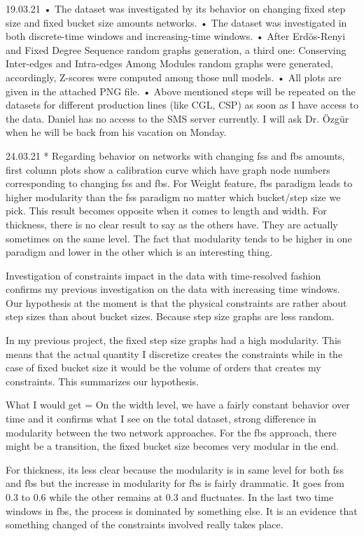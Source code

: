 19.03.21
•	The dataset was investigated by its behavior on changing fixed step size and fixed bucket size amounts networks.
•	The dataset was investigated in both discrete-time windows and increasing-time windows.
•	After Erdös-Renyi and Fixed Degree Sequence random graphs generation, a third one: Conserving Inter-edges and Intra-edges Among Modules random graphs were generated, accordingly, Z-scores were computed among those null models.
•	All plots are given in the attached PNG file.
•	Above mentioned steps will be repeated on the datasets for different production lines (like CGL, CSP) as soon as I have access to the data. Daniel has no access to the SMS server currently. I will ask Dr. Özgür when he will be back from his vacation on Monday.

24.03.21
* Regarding behavior on networks with changing fss and fbs amounts, first column plots show a calibration curve which have graph node numbers corresponding to changing fss and fbs. For Weight feature, fbs paradigm leads to higher modularity than the fss paradigm no matter which bucket/step size we pick. This result becomes opposite when it comes to length and width. For thickness, there is no clear result to say as the others have. They are actually sometimes on the same level. The fact that modularity tends to be higher in one paradigm and lower in the other which is an interesting thing.

Investigation of constraints impact in the data with time-resolved fashion confirms my previous investigation on the data with increasing time windows. 
Our hypothesis at the moment is that the physical constraints are rather about step sizes than about bucket sizes. Because step size graphs are less random.

In my previous project, the fixed step size graphs had a high modularity. This means that the actual quantity I discretize creates the constraints while in the case of fixed bucket size it would be the volume of orders that creates my constraints. This summarizes our hypothesis. 

What I would get = On the width level, we have a fairly constant behavior over time and it confirms what I see on the total dataset, strong difference in modularity between the two network approaches. For the fbs approach, there might be a transition, the fixed bucket size becomes very modular in the end.

For thickness, its less clear because the modularity is in same level for both fss and fbs but the increase in modularity for fbs is fairly drammatic. It goes from 0.3 to 0.6 while the other remains at 0.3 and fluctuates. In the last two time windows in fbs, the process is dominated by something else. It is an evidence that something changed of the constraints involved really takes place.

